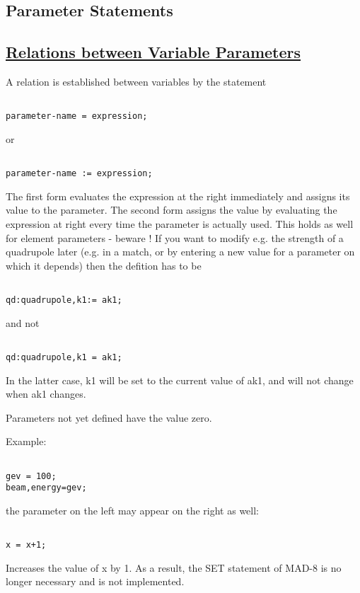 



\subsection{Parameter Statements}

\subsection{\href{relation}{Relations between Variable Parameters}}
 A relation is established between variables by the statement 
\begin{verbatim}

parameter-name = expression;
\end{verbatim} or 
\begin{verbatim}

parameter-name := expression;
\end{verbatim} The first form evaluates the expression at the right immediately and assigns its value to the parameter. The second form assigns the value by evaluating  the expression at right every time the parameter is actually used. This holds as well for element parameters - beware ! If you want to modify e.g. the strength of a quadrupole later (e.g. in a match,  or by entering a new value for a parameter on which it depends) then the defition has to be 
\begin{verbatim}

qd:quadrupole,k1:= ak1;
\end{verbatim} and not 
\begin{verbatim}

qd:quadrupole,k1 = ak1;
\end{verbatim} In the latter case, k1 will be set to the current value of ak1, and will not change when ak1 changes. 

 Parameters not yet defined have the value zero. 

 Example: 
\begin{verbatim}

gev = 100;
beam,energy=gev;
\end{verbatim} the parameter on the left may appear on the right as well: 
\begin{verbatim}

x = x+1;
\end{verbatim} Increases the value of x by 1. As a result, the SET statement of MAD-8 is no longer necessary and is not implemented. 

